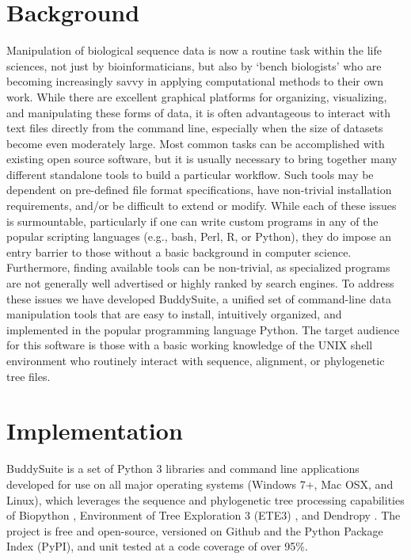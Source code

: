 \documentclass[twocolumn]{bmcart}%
\begin{document}
\section*{Background}
Manipulation of biological sequence data is now a routine task within the life sciences, not just by bioinformaticians, but also by `bench biologists' who are becoming increasingly savvy in applying computational methods to their own work. While there are excellent graphical platforms for organizing, visualizing, and manipulating these forms of data, it is often advantageous to interact with text files directly from the command line, especially when the size of datasets become even moderately large. Most common tasks can be accomplished with existing open source software, but it is usually necessary to bring together many different standalone tools to build a particular workflow. Such tools may be dependent on pre-defined file format specifications, have non-trivial installation requirements, and/or be difficult to extend or modify. While each of these issues is surmountable, particularly if one can write custom programs in any of the popular scripting languages (e.g., bash, Perl, R, or Python), they do impose an entry barrier to those without a basic background in computer science. Furthermore, finding available tools can be non-trivial, as specialized programs are not generally well advertised or highly ranked by search engines. To address these issues we have developed BuddySuite, a unified set of command-line data manipulation tools that are easy to install, intuitively organized, and implemented in the popular programming language Python. The target audience for this software is those with a basic working knowledge of the UNIX shell environment who routinely interact with sequence, alignment, or phylogenetic tree files.


\section*{Implementation}
BuddySuite is a set of Python 3 libraries and command line applications developed for use on all major operating systems (Windows 7+, Mac OSX, and Linux), which leverages the sequence and phylogenetic tree processing capabilities of Biopython \cite{Cock:2009hj}, Environment of Tree Exploration 3 (ETE3) \cite{HuertaCepas:2016hw}, and Dendropy \cite{Sukumaran:2010id}. The project is free and open-source, versioned on Github \cite{github} and the Python Package Index \cite{pypi} (PyPI), and unit tested at a code coverage of over 95\%. 
\end{document}
